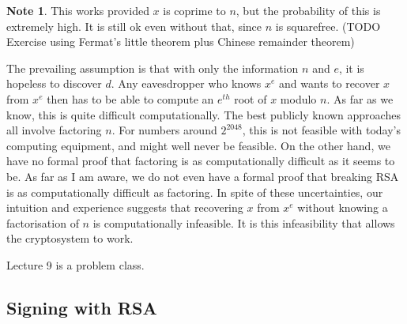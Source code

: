 \documentclass{article}
\theoremstyle{definition}\newtheorem{definition}{Definition}
\theoremstyle{definition}\newtheorem*{remark}{Remark}
\theoremstyle{definition}\newtheorem*{example}{Example}
\theoremstyle{definition}\newtheorem*{note}{Note}
\begin{document}
\begin{note}
This works provided $ x $ is coprime to $ n $, but the probability of this is extremely high. It is still ok even without that, since $ n $ is squarefree. (TODO Exercise using Fermat's little theorem plus Chinese remainder theorem)
\end{note}

The prevailing assumption is that with only the information $ n $ and $ e $, it is hopeless to discover $ d $. Any eavesdropper who knows $ x^e $ and wants to recover $ x $ from $ x^e $ then has to be able to compute an $ e^{th} $ root of $ x $ modulo $ n $. As far as we know, this is quite difficult computationally. The best publicly known approaches all involve factoring $ n $. For numbers around $ 2^{2048} $, this is not feasible with today's computing equipment, and might well never be feasible. On the other hand, we have no formal proof that factoring is as computationally difficult as it seems to be. As far as I am aware, we do not even have a formal proof that breaking RSA is as computationally difficult as factoring. In spite of these uncertainties, our intuition and experience suggests that recovering $ x $ from $ x^e $ without knowing a factorisation of $ n $ is computationally infeasible. It is this infeasibility that allows the cryptosystem to work.


Lecture 9 is a problem class.


\subsection{Signing with RSA}
\end{document}
